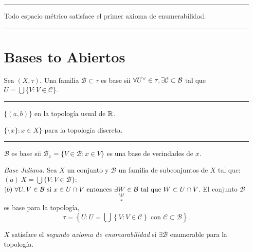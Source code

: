 \E

\hrule
\begin{example}
    Todo espacio métrico satisface el primer axioma de enumerabilidad.
\end{example}
\hrule 

\E

\section*{Bases to Abiertos}

\begin{definition}
    Sea \((X,\tau)\). Una familia \(\mathcal{B}\subset \tau \) es base sii \(\forall U^\ab\in \tau, \exists \mathcal{C}\subset \mathcal{B}\) tal que \(U=\displaystyle\bigcup \{V:V\in \mathcal{C}\}\). 
\end{definition}

\E

\hrule 
\begin{example}
    \(\{(a,b)\}\)  en la topología usual de \(\mathbb{R}\). 
\end{example}
\begin{example}
    \(\{\{x\}: x\in X\}\) para la topología discreta. 
\end{example}
\hrule 

\E

\begin{proposition}
    \(\mathcal{B}\) es base sii \(\mathcal{B}_x = \{V\in \mathcal{B}: x\in V\}\) es una base de vecindades de \(x\). 
\end{proposition}
\begin{proposition}
    \emph{Base Juliana.} Sea \(X\) un conjunto y \(\mathcal{B}\) un familia de subconjuntos de \(X\) tal que: \((a) \ X = \displaystyle \bigcup \{V:V\in \mathcal{B}\}\);  \((b) \ \forall U,V \in \mathcal{B} \text{ si } x\in U\cap V \text{ entonces } \exists\underset{\underset{x}{\rotatebox{90}{$\in$}}}{W} \in  \mathcal{B} \text{ tal que }  W\subset U\cap V\). El conjunto \(\mathcal{B}\) es base para la topología, 
    \vspace{-0.2cm} 
    \[\tau = \left\{U : U = \bigcup\left\{ V:  V\in \mathcal{C} \right\} \text{ con } \mathcal{C}\subset \mathcal{B}\right\}.\] 
\end{proposition}
\begin{definition}
    \(X\) satisface el \emph{segundo axioma de enumarabilidad} si \(\exists \mathcal{B}\) enumerable para la topología. 
\end{definition}

